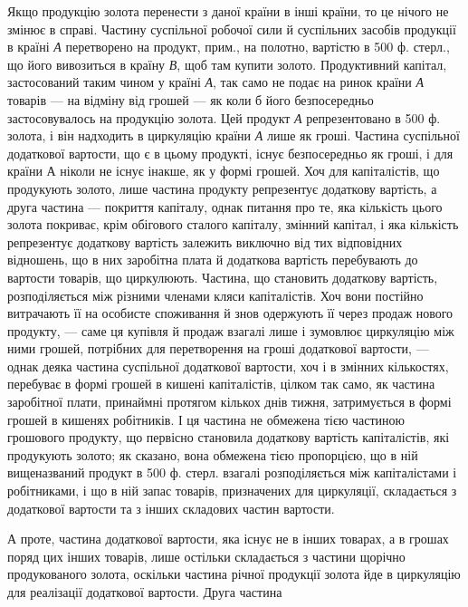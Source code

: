 Якщо продукцію золота перенести з даної країни в інші країни, то
це нічого не змінює в справі. Частину суспільної робочої сили й суспільних
засобів продукції в країні \emph{А} перетворено на продукт, прим., на
полотно, вартістю в 500 ф. стерл., що його вивозиться в країну \emph{В}, щоб
там купити золото. Продуктивний капітал, застосований таким чином у
країні \emph{А}, так само не подає на ринок країни \emph{А} товарів — на відміну
від грошей — як коли б його безпосередньо застосовувалось на продукцію
золота. Цей продукт \emph{А} репрезентовано в 500 ф. золота, і він
надходить в циркуляцію країни \emph{А} лише як гроші. Частина суспільної
додаткової вартости, що є в цьому продукті, існує безпосередньо як
гроші, і для країни А ніколи не існує інакше, як у формі грошей. Хоч
для капіталістів, що продукують золото, лише частина продукту репрезентує
додаткову вартість, а друга частина — покриття капіталу, однак питання
про те, яка кількість цього золота покриває, крім обігового сталого
капіталу, змінний капітал, і яка кількість репрезентує додаткову
вартість залежить виключно від тих відповідних відношень,
що в них заробітна плата й додаткова вартість перебувають до
вартости товарів, що циркулюють. Частина, що становить додаткову
вартість, розподіляється між різними членами кляси капіталістів. Хоч
вони постійно витрачають її на особисте споживання й знов одержують
її через продаж нового продукту, — саме ця купівля й продаж взагалі
лише і зумовлює циркуляцію між ними грошей, потрібних для перетворення
на гроші додаткової вартости, — однак деяка частина суспільної
додаткової вартости, хоч і в змінних кількостях, перебуває в формі
грошей в кишені капіталістів, цілком так само, як частина заробітної
плати, принаймні протягом кількох днів тижня, затримується в формі грошей
в кишенях робітників. І ця частина не обмежена тією частиною грошового
продукту, що первісно становила додаткову вартість капіталістів, які
продукують золото; як сказано, вона обмежена тією пропорцією, що в
ній вищеназваний продукт в 500 ф. стерл. взагалі розподіляється між
капіталістами і робітниками, і що в ній запас товарів, призначених для
циркуляції, складається з додаткової вартости та з інших складових частин
вартости.

А проте, частина додаткової вартости, яка існує не в інших товарах,
а в грошах поряд цих інших товарів, лише остільки складається з частини
щорічно продукованого золота, оскільки частина річної продукції золота
йде в циркуляцію для реалізації додаткової вартости. Друга частина
\parbreak{}  %
